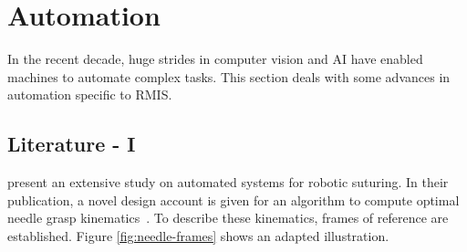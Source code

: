 \documentclass[english]{sobraep}
\begin{document}
\section{Automation}\label{sec:Automation}
\par{In the recent decade, huge strides in computer vision and AI have enabled machines to automate complex tasks. %
This section deals with some advances in automation specific to RMIS.}
\subsection{Literature - I}
\par{\citeauthor{needle-grasp} present an extensive study on automated systems for robotic suturing. In their publication, a novel design account is given for an algorithm to compute optimal needle grasp kinematics~\cite{needle-grasp}. To describe these kinematics, frames of reference are established. Figure \ref{fig:needle-frames} shows an adapted illustration.} 
\end{document}
